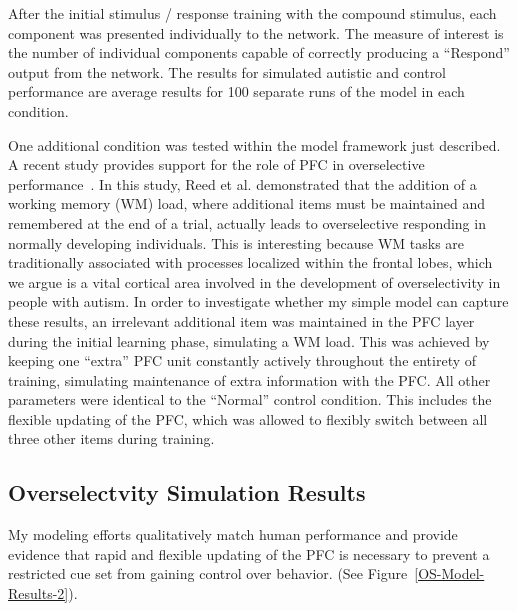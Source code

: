 After the initial stimulus / response training with the compound stimulus, each component was presented individually to the network.  The measure of interest is the number of individual components capable of correctly producing a ``Respond'' output from the network.  The results for simulated autistic and control performance are average results for 100 separate runs of the model in each condition.

One additional condition was tested within the model framework just described.  A recent study provides support for the role of PFC in overselective performance~\cite{ReedP:2005:TaskLoad}.  In this study, Reed et al. demonstrated that the addition of a working memory (WM) load, where additional items must be maintained and remembered at the end of a trial, actually leads to overselective responding in normally developing individuals.  This is interesting because WM tasks are traditionally associated with processes localized within the frontal lobes, which we argue is a vital cortical area involved in the development of overselectivity in people with autism.  In order to investigate whether my simple model can capture these results, an irrelevant additional item was maintained in the PFC layer during the initial learning phase, simulating a WM load.  This was achieved by keeping one ``extra'' PFC unit constantly actively throughout the entirety of training, simulating maintenance of extra information with the PFC.  All other parameters were identical to the ``Normal'' control condition.  This includes the flexible updating of the PFC, which  was allowed to flexibly switch between all three other items during training.

\subsection{Overselectvity Simulation Results}
My modeling efforts qualitatively match human performance and provide evidence that rapid and flexible updating of the PFC is necessary to prevent a restricted cue set from gaining control over behavior. (See Figure~\ref{OS-Model-Results-2}).  

